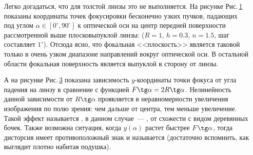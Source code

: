 \begin{figure}[h]
\begin{subfigure}{0.49\tw}
		\caption{}
		\label{pic:pitzval}
	\end{subfigure}
	\hfill
	\begin{subfigure}{0.49\tw}
		\caption{}
		\label{pic:distorsion-y}
	\end{subfigure}
	\caption{}
	
\end{figure}


Легко догадаться, что для толстой линзы это не выполняется. На рисунке Рис.\,\ref{pic:pitzval} показаны координаты точек фокусировки бесконечно узких пучков, падающих под углом $\alpha \in [0^\circ, 90^\circ]$ к оптической оси на центр передней поверхности рассмотренной выше плосковыпуклой линзы: ($R = 1$, $h = 0.3$, $n=1.5$, шаг составляет $1^\circ$). Отсюда ясно, что фокальная <<плоскость>> является таковой только в очень узком диапазоне направлений вокруг оптической оси. В остальной области фокальная поверхность является выпуклой в сторону от линзы.

  А на рисунке Рис.\,\ref{pic:distorsion-y} показана зависимость $y$-координаты точки фокуса от угла падения на линзу в сравнение с функцией $F \tg \alpha = 2R \tg \alpha$. Нелинейность данной зависимости от $R \tg \alpha$ проявляется в неравномерности увеличения изображения по полю зрения: чем дальше от центра, тем меньше увеличение. Такой эффект называется , в данном случае~--- , от схожести с видом деревянных бочек. Также возможна ситуация, когда $y(\alpha)$ растет быстрее $F \tg \alpha$, тогда дисторсия имеет противоположный знак и называется  (достаточно вспомнить, как выглядит плотно набитая подушка).
  
